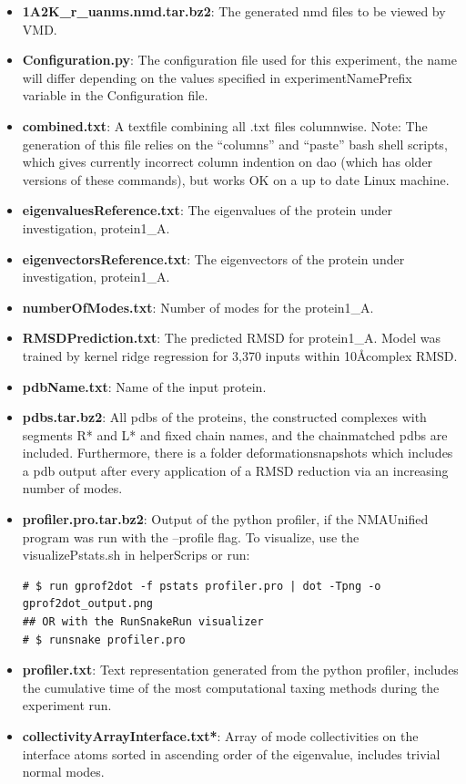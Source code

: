 \documentclass[11pt]{article}
\begin{document}
\begin{itemize}
 \item \textbf{1A2K\_r\_uanms.nmd.tar.bz2}: The generated nmd files to be viewed by VMD.
  \item \textbf{Configuration.py}: The configuration file used for this experiment, the name will differ depending on the values specified in experimentNamePrefix variable in the Configuration file.
 \item \textbf{combined.txt}: A textfile combining all .txt files columnwise. Note: The generation of this file relies on the ``columns'' and ``paste'' bash shell scripts, which gives currently incorrect column indention on dao (which has older versions of these commands), but works OK on a up to date Linux machine. 
 \item \textbf{eigenvaluesReference.txt}: The eigenvalues of the protein under investigation, protein1\_A.
 \item \textbf{eigenvectorsReference.txt}: The eigenvectors of the protein under investigation, protein1\_A.
 \item \textbf{numberOfModes.txt}: Number of modes for the protein1\_A.
 \item \textbf{RMSDPrediction.txt}: The predicted RMSD for protein1\_A. Model was trained by kernel ridge regression for 3,370 inputs within 10\AA complex RMSD.
 \item \textbf{pdbName.txt}: Name of the input protein.
 \item \textbf{pdbs.tar.bz2}: All pdbs of the proteins, the constructed complexes with segments R* and L* and fixed chain names, and the chainmatched pdbs are included. Furthermore, there is a folder deformationsnapshots which includes a pdb output after every application of a RMSD reduction via an increasing number of modes. 
 \item \textbf{profiler.pro.tar.bz2}: Output of the python profiler, if the NMAUnified program was run with the --profile flag. To visualize, use the visualizePstats.sh in helperScrips or run: 
 \begin{verbatim}
# $ run gprof2dot -f pstats profiler.pro | dot -Tpng -o gprof2dot_output.png
## OR with the RunSnakeRun visualizer
# $ runsnake profiler.pro
 \end{verbatim}
 \item \textbf{profiler.txt}: Text representation generated from the python profiler, includes the cumulative time of the most computational taxing methods during the experiment run.
  \item \textbf{collectivityArrayInterface.txt*}: Array of mode collectivities on the interface atoms sorted in ascending order of the eigenvalue, includes trivial normal modes.

\end{itemize}
\end{document}
